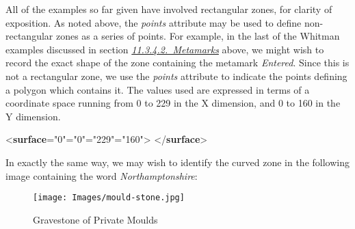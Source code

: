 All of the examples so far given have involved rectangular zones, for clarity of exposition. As noted above, the {\itshape points} attribute may be used to define non-rectangular zones as a series of points. For example, in the last of the Whitman examples discussed in section \textit{\hyperref[PH-meta]{11.3.4.2.\ Metamarks}} above, we might wish to record the exact shape of the zone containing the metamark \textit{Entered}. Since this is not a rectangular zone, we use the {\itshape points} attribute to indicate the points defining a polygon which contains it. The values used are expressed in terms of a coordinate space running from 0 to 229 in the X dimension, and 0 to 160 in the Y dimension.\par\bgroup{}\exampleFont \begin{shaded}\noindent\mbox{}{<\textbf{surface}\hspace*{1em}{ulx}="{0}"\hspace*{1em}{uly}="{0}"\hspace*{1em}{lrx}="{229}"\hspace*{1em}{lry}="{160}">}\mbox{}\newline 
{}\mbox{}\newline 
{}\mbox{}\newline 
{</\textbf{surface}>}\end{shaded}\egroup\par \par
In exactly the same way, we may wish to identify the curved zone in the following image containing the word \textit{Northamptonshire}: \begin{figure}[htbp]
\noindent\noindent\texttt{[image: Images/mould-stone.jpg]}
\caption{Gravestone of Private Moulds}\end{figure}
